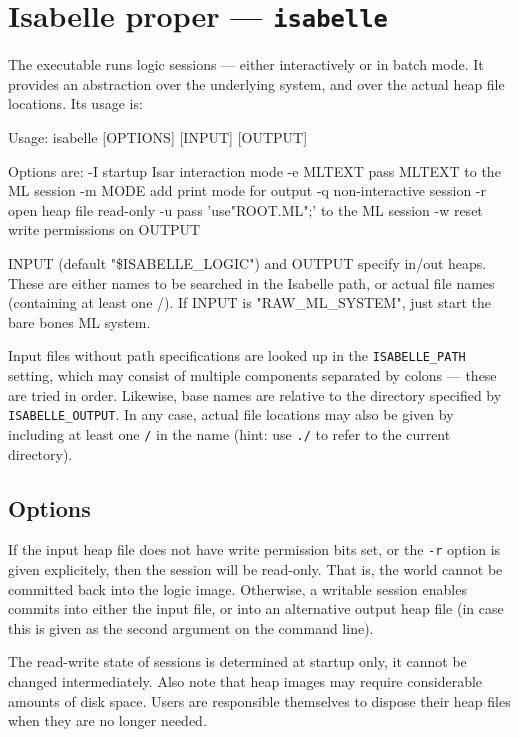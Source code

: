 \section{Isabelle proper --- \texttt{isabelle}}

The  executable runs logic sessions --- either
interactively or in batch mode. It provides an abstraction over the
underlying {\ML} system, and over the actual heap file locations. Its
usage is:
\begin{ttbox}
Usage: isabelle [OPTIONS] [INPUT] [OUTPUT]

  Options are:
    -I           startup Isar interaction mode
    -e MLTEXT    pass MLTEXT to the ML session
    -m MODE      add print mode for output
    -q           non-interactive session
    -r           open heap file read-only
    -u           pass 'use"ROOT.ML";' to the ML session
    -w           reset write permissions on OUTPUT

  INPUT (default "\$ISABELLE_LOGIC") and OUTPUT specify in/out heaps.
  These are either names to be searched in the Isabelle path, or actual
  file names (containing at least one /).
  If INPUT is "RAW_ML_SYSTEM", just start the bare bones ML system.
\end{ttbox}
Input files without path specifications are looked up in the
\texttt{ISABELLE_PATH} setting, which may consist of multiple
components separated by colons --- these are tried in order.
Likewise, base names are relative to the directory specified by
\texttt{ISABELLE_OUTPUT}.  In any case, actual file locations may also
be given by including at least one \texttt{/} in the name (hint: use
\texttt{./} to refer to the current directory).


\subsection*{Options}

If the input heap file does not have write permission bits set, or the
\texttt{-r} option is given explicitely, then the session will be
read-only. That is, the {\ML} world cannot be committed back into the
logic image.  Otherwise, a writable session enables commits into
either the input file, or into an alternative output heap file (in
case this is given as the second argument on the command line).

The read-write state of sessions is determined at startup only, it
cannot be changed intermediately. Also note that heap images may
require considerable amounts of disk space. Users are responsible
themselves to dispose their heap files when they are no longer needed.

